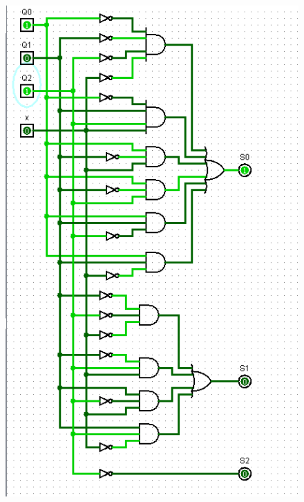 \documentclass[]{article}
\begin{document}
\begin{minipage}{0.5\textwidth}
\begin{figure}[H]
	\centering
	\includegraphics[width=1\textwidth]{test0_5.png}
\end{figure}
\end{minipage}
\end{document}
